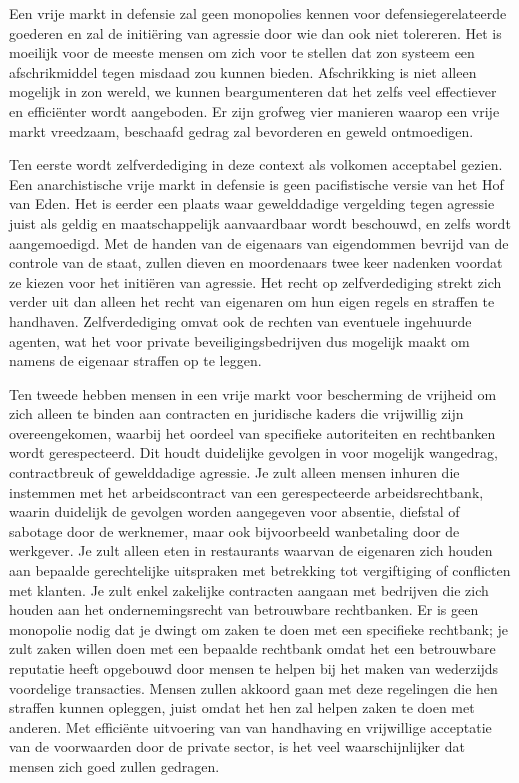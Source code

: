 Een vrije markt in defensie zal geen monopolies kennen voor defensiegerelateerde goederen en zal de initiëring van agressie door wie dan ook niet tolereren. Het is moeilijk voor de meeste mensen om zich voor te stellen dat zo\textquotesingle n systeem een afschrikmiddel tegen misdaad zou kunnen bieden. Afschrikking is niet alleen mogelijk in zo\textquotesingle n wereld, we kunnen beargumenteren dat het zelfs veel effectiever en efficiënter wordt aangeboden. Er zijn grofweg vier manieren waarop een vrije markt vreedzaam, beschaafd gedrag zal bevorderen en geweld ontmoedigen.

Ten eerste wordt zelfverdediging in deze context als volkomen acceptabel gezien. Een anarchistische vrije markt in defensie is geen pacifistische versie van het Hof van Eden. Het is eerder een plaats waar gewelddadige vergelding tegen agressie juist als geldig en maatschappelijk aanvaardbaar wordt beschouwd, en zelfs wordt aangemoedigd. Met de handen van de eigenaars van eigendommen bevrijd van de controle van de staat, zullen dieven en moordenaars twee keer nadenken voordat ze kiezen voor het initiëren van agressie. Het recht op zelfverdediging strekt zich verder uit dan alleen het recht van eigenaren om hun eigen regels en straffen te handhaven. Zelfverdediging omvat ook de rechten van eventuele ingehuurde agenten, wat het voor private beveiligingsbedrijven dus mogelijk maakt om namens de eigenaar straffen op te leggen.

Ten tweede hebben mensen in een vrije markt voor bescherming de vrijheid om zich alleen te binden aan contracten en juridische kaders die vrijwillig zijn overeengekomen, waarbij het oordeel van specifieke autoriteiten en rechtbanken wordt gerespecteerd. Dit houdt duidelijke gevolgen in voor mogelijk wangedrag, contractbreuk of gewelddadige agressie. Je zult alleen mensen inhuren die instemmen met het arbeidscontract van een gerespecteerde arbeidsrechtbank, waarin duidelijk de gevolgen worden aangegeven voor absentie, diefstal of sabotage door de werknemer, maar ook bijvoorbeeld wanbetaling door de werkgever. Je zult alleen eten in restaurants waarvan de eigenaren zich houden aan bepaalde gerechtelijke uitspraken met betrekking tot vergiftiging of conflicten met klanten. Je zult enkel zakelijke contracten aangaan met bedrijven die zich houden aan het ondernemingsrecht van betrouwbare rechtbanken. Er is geen monopolie nodig dat je dwingt om zaken te doen met een specifieke rechtbank; je zult zaken willen doen met een bepaalde rechtbank omdat het een betrouwbare reputatie heeft opgebouwd door mensen te helpen bij het maken van wederzijds voordelige transacties. Mensen zullen akkoord gaan met deze regelingen die hen straffen kunnen opleggen, juist omdat het hen zal helpen zaken te doen met anderen. Met efficiënte uitvoering van van handhaving en vrijwillige acceptatie van de voorwaarden door de private sector, is het veel waarschijnlijker dat mensen zich goed zullen gedragen.

